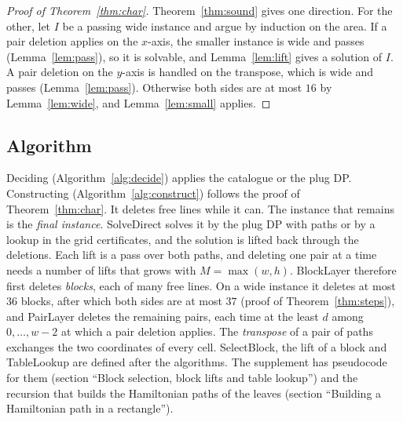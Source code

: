 \documentclass[11pt]{article}
\makeatletter
\newcommand{\secmark}[1]{\pdfsavepos\protected@write\@auxout{}{\string\secpos{#1}{\thepage}{\noexpand\the\noexpand\pdflastypos}}}
\def\secpos#1#2#3{}
\makeatother
\begin{document}

\begin{proof}[Proof of Theorem~\ref{thm:char}]
Theorem~\ref{thm:sound} gives one direction. For the other, let $I$ be a passing wide instance and
argue by induction on the area. If a pair deletion applies on the $x$-axis, the smaller instance is
wide and passes (Lemma~\ref{lem:pass}), so it is solvable, and Lemma~\ref{lem:lift} gives a
solution of $I$. A pair deletion on the $y$-axis is handled on the transpose, which is wide and
passes (Lemma~\ref{lem:pass}). Otherwise both sides are at most $16$ by Lemma~\ref{lem:wide}, and
Lemma~\ref{lem:small} applies.
\end{proof}

\secmark{algo}
\subsection{Algorithm}\label{sec:algo}

Deciding (Algorithm~\ref{alg:decide}) applies the catalogue or the plug DP. Constructing
(Algorithm~\ref{alg:construct}) follows the proof of Theorem~\ref{thm:char}. It deletes free lines
while it can. The instance that remains is the \emph{final instance}. SolveDirect solves it by the
plug DP with paths or by a lookup in the grid certificates, and the solution is lifted back through
the deletions. Each lift is a pass over both paths, and deleting one pair at a time needs
a number of lifts that grows with $M=\max(w,h)$. BlockLayer therefore first deletes \emph{blocks}, each
of many free lines. On a wide instance it deletes at most $36$ blocks, after which both sides are at
most $37$ (proof of Theorem~\ref{thm:steps}), and PairLayer deletes the remaining pairs, each time
at the least $d$ among $0,\ldots,w-2$ at which a pair deletion applies. The
\emph{transpose} of a pair of paths exchanges the two coordinates of every cell. SelectBlock, the
lift of a block and TableLookup are defined after the algorithms. The supplement has pseudocode for
them (section ``Block selection, block lifts and table lookup'') and the recursion that builds the
Hamiltonian paths of the leaves (section ``Building a Hamiltonian path in a rectangle'').
\end{document}
